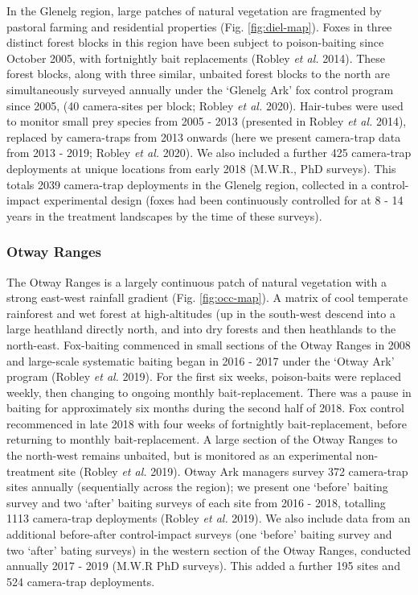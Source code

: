 \documentclass[11pt,a4paper,titlepage,twoside,openright]{style/unimelbthesis}
\begin{document}
\begin{mainmatter}
In the Glenelg region, large patches of natural vegetation are fragmented by pastoral farming and residential properties (Fig. \ref{fig:diel-map}). Foxes in three distinct forest blocks in this region have been subject to poison-baiting since October 2005, with fortnightly bait replacements (Robley \emph{et al.} 2014). These forest blocks, along with three similar, unbaited forest blocks to the north are simultaneously surveyed annually under the `Glenelg Ark' fox control program since 2005, (40 camera-sites per block; Robley \emph{et al.} 2020). Hair-tubes were used to monitor small prey species from 2005 - 2013 (presented in Robley \emph{et al.} 2014), replaced by camera-traps from 2013 onwards (here we present camera-trap data from 2013 - 2019; Robley \emph{et al.} 2020). We also included a further 425 camera-trap deployments at unique locations from early 2018 (M.W.R., PhD surveys). This totals 2039 camera-trap deployments in the Glenelg region, collected in a control-impact experimental design (foxes had been continuously controlled for at 8 - 14 years in the treatment landscapes by the time of these surveys).

\hypertarget{otway-ranges-2}{%
\subsubsection{Otway Ranges}\label{otway-ranges-2}}

The Otway Ranges is a largely continuous patch of natural vegetation with a strong east-west rainfall gradient (Fig. \ref{fig:occ-map}). A matrix of cool temperate rainforest and wet forest at high-altitudes (up in the south-west descend into a large heathland directly north, and into dry forests and then heathlands to the north-east. Fox-baiting commenced in small sections of the Otway Ranges in 2008 and large-scale systematic baiting began in 2016 - 2017 under the `Otway Ark' program (Robley \emph{et al.} 2019). For the first six weeks, poison-baits were replaced weekly, then changing to ongoing monthly bait-replacement. There was a pause in baiting for approximately six months during the second half of 2018. Fox control recommenced in late 2018 with four weeks of fortnightly bait-replacement, before returning to monthly bait-replacement. A large section of the Otway Ranges to the north-west remains unbaited, but is monitored as an experimental non-treatment site (Robley \emph{et al.} 2019). Otway Ark managers survey 372 camera-trap sites annually (sequentially across the region); we present one `before' baiting survey and two `after' baiting surveys of each site from 2016 - 2018, totalling 1113 camera-trap deployments (Robley \emph{et al.} 2019). We also include data from an additional before-after control-impact surveys (one `before' baiting survey and two `after' bating surveys) in the western section of the Otway Ranges, conducted annually 2017 - 2019 (M.W.R PhD surveys). This added a further 195 sites and 524 camera-trap deployments.


\end{mainmatter}
\end{document}
